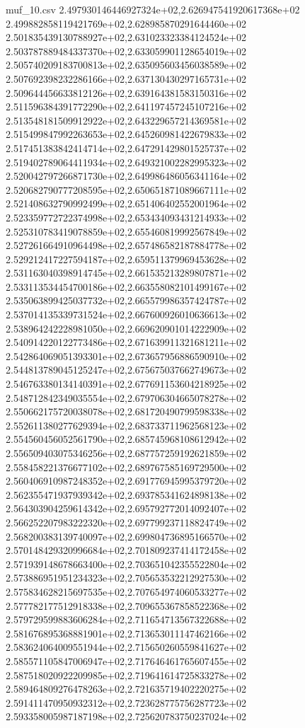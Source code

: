 \begin{filecontents*}{muf_10.csv}
2.497930146446927324e+02,2.626947541920617368e+02
2.499882858119421769e+02,2.628985870291644460e+02
2.501835439130788927e+02,2.631023323384124524e+02
2.503787889484337370e+02,2.633059901128654019e+02
2.505740209183700813e+02,2.635095603456038589e+02
2.507692398232286166e+02,2.637130430297165731e+02
2.509644456633812126e+02,2.639164381583150316e+02
2.511596384391772290e+02,2.641197457245107216e+02
2.513548181509912922e+02,2.643229657214369581e+02
2.515499847992263653e+02,2.645260981422679833e+02
2.517451383842414714e+02,2.647291429801525737e+02
2.519402789064411934e+02,2.649321002282995323e+02
2.520042797266871730e+02,2.649986486056341164e+02
2.520682790777208595e+02,2.650651871089667111e+02
2.521408632790992499e+02,2.651406402552001964e+02
2.523359772722374998e+02,2.653434093431214933e+02
2.525310783419078859e+02,2.655460819992567849e+02
2.527261664910964498e+02,2.657486582187884778e+02
2.529212417227594187e+02,2.659511379969453628e+02
2.531163040398914745e+02,2.661535213289807871e+02
2.533113534454700186e+02,2.663558082101499167e+02
2.535063899425037732e+02,2.665579986357424787e+02
2.537014135339731524e+02,2.667600926010636613e+02
2.538964242228981050e+02,2.669620901014222909e+02
2.540914220122773486e+02,2.671639911321681211e+02
2.542864069051393301e+02,2.673657956886590910e+02
2.544813789045125247e+02,2.675675037662749673e+02
2.546763380134140391e+02,2.677691153604218925e+02
2.548712842349035554e+02,2.679706304665078278e+02
2.550662175720038078e+02,2.681720490799598338e+02
2.552611380277629394e+02,2.683733711962568123e+02
2.554560456052561790e+02,2.685745968108612942e+02
2.556509403075346256e+02,2.687757259192621859e+02
2.558458221376677102e+02,2.689767585169729500e+02
2.560406910987248352e+02,2.691776945995379720e+02
2.562355471937939342e+02,2.693785341624898138e+02
2.564303904259614342e+02,2.695792772014092407e+02
2.566252207983222320e+02,2.697799237118824749e+02
2.568200383139740097e+02,2.699804736895166570e+02
2.570148429320996684e+02,2.701809237414172458e+02
2.571939148678663400e+02,2.703651042355522804e+02
2.573886951951234323e+02,2.705653532212927530e+02
2.575834628215697535e+02,2.707654974060533277e+02
2.577782177512918338e+02,2.709655367858522368e+02
2.579729599883606284e+02,2.711654713567322688e+02
2.581676895368881901e+02,2.713653011147462166e+02
2.583624064009551944e+02,2.715650260559841627e+02
2.585571105847006947e+02,2.717646461765607455e+02
2.587518020922209985e+02,2.719641614725833278e+02
2.589464809276478263e+02,2.721635719402220275e+02
2.591411470950932312e+02,2.723628775756287723e+02
2.593358005987187198e+02,2.725620783750237024e+02

\end{filecontents*}
